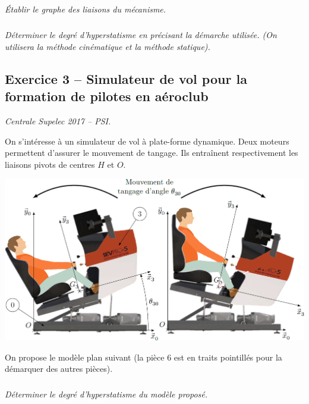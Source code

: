 \documentclass[10pt,fleqn]{article} %
\begin{document}
\begin{multicols}{2}
\subparagraph{}
\textit{Établir le graphe des liaisons du mécanisme.}
\ifprof
\begin{corrige}
\end{corrige}\else\fi

\subparagraph{}
\textit{Déterminer le degré d'hyperstatisme en précisant la démarche utilisée. (On utilisera la méthode cinématique et la méthode statique).}
\ifprof
\begin{corrige}
\end{corrige}\else\fi

\subsection*{Exercice 3 -- Simulateur de vol pour la formation de pilotes en aéroclub}
\setcounter{exo}{0}
\begin{flushright}
\textit{Centrale Supelec 2017 -- PSI.}
\end{flushright}
On s’intéresse à un simulateur de vol à plate-forme dynamique. 
%
Deux moteurs permettent d'assurer le mouvement de tangage.  Ils entraînent respectivement les liaisons pivots de centres $H$ et $O$. 

\begin{center}
\includegraphics[width=\linewidth]{images/aero_04.png}
\end{center}

On propose le modèle plan suivant (la pièce 6 est en traits pointillés pour la démarquer des autres pièces).

\subparagraph{}\textit{Déterminer le degré d'hyperstatisme du modèle proposé.}


\end{multicols}
\end{document}
